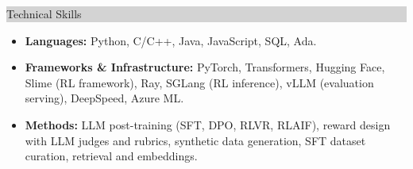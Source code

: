 \documentclass{article} %
\newcommand{\rsection}[1]{
  \hspace{-0.4cm}\vspace{0.1cm}
\colorbox{lightgrey}{
\begin{minipage}{1.07\linewidth}
\vspace{0.22cm}
\fontsize{14pt}{16pt}\selectfont #1
\vspace{0.12cm}
\end{minipage}
}
\vspace*{-0.1cm}
}
\begin{document}
\vspace{0.05cm}
\rsection{Technical Skills}
\hspace*{-0.1cm}
\begin{minipage}{1.01\linewidth}
\begin{itemize}[label={},itemindent=-2em,leftmargin=2em,parsep=1pt,itemsep=0pt,topsep=3pt]
  \item \textbf{Languages:} Python, C/C++, Java, JavaScript, SQL, Ada.
  \item \textbf{Frameworks \& Infrastructure:} PyTorch, Transformers, Hugging Face, Slime (RL framework), Ray, SGLang (RL inference), vLLM (evaluation serving), DeepSpeed, Azure ML.
  \item \textbf{Methods:} LLM post-training (SFT, DPO, RLVR, RLAIF), reward design with LLM judges and rubrics, synthetic data generation, SFT dataset curation, retrieval and embeddings.
  \end{itemize}
\end{minipage}
\end{document}
